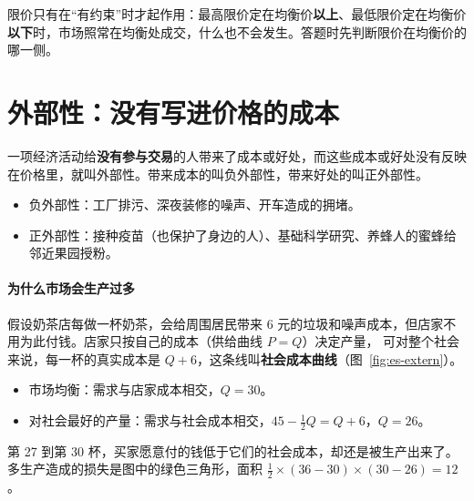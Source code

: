\begin{pitfall}
限价只有在“有约束”时才起作用：最高限价定在均衡价\textbf{以上}、最低限价定在均衡价\textbf{以下}时，市场照常在均衡处成交，什么也不会发生。答题时先判断限价在均衡价的哪一侧。
\end{pitfall}

\section{外部性：没有写进价格的成本}

\begin{definition}[外部性]
一项经济活动给\textbf{没有参与交易}的人带来了成本或好处，而这些成本或好处没有反映在价格里，就叫外部性。带来成本的叫负外部性，带来好处的叫正外部性。
\end{definition}

\begin{itemize}
  \item 负外部性：工厂排污、深夜装修的噪声、开车造成的拥堵。
  \item 正外部性：接种疫苗（也保护了身边的人）、基础科学研究、养蜂人的蜜蜂给邻近果园授粉。
\end{itemize}

\paragraph{为什么市场会生产过多}
假设奶茶店每做一杯奶茶，会给周围居民带来 6 元的垃圾和噪声成本，但店家不用为此付钱。店家只按自己的成本（供给曲线 $P=Q$）决定产量，
可对整个社会来说，每一杯的真实成本是 $Q+6$，这条线叫\textbf{社会成本曲线}（图~\ref{fig:es-extern}）。
\begin{itemize}
  \item 市场均衡：需求与店家成本相交，$Q=30$。
  \item 对社会最好的产量：需求与社会成本相交，$45-\frac12Q=Q+6$，$Q=26$。
\end{itemize}
第 27 到第 30 杯，买家愿意付的钱低于它们的社会成本，却还是被生产出来了。多生产造成的损失是图中的绿色三角形，面积
$\frac12\times(36-30)\times(30-26)=12$。

